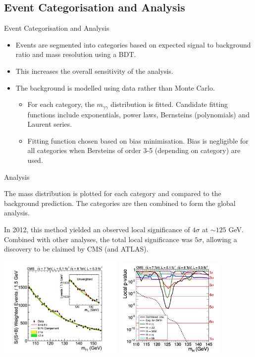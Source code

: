 \documentclass{beamer}
\begin{document}
\subsection{Event Categorisation and Analysis}

\begin{frame}{Event Categorisation and Analysis}
\begin{itemize}
\item Events are segmented into categories based on expected signal to background ratio and mass resolution using a BDT.
\item This increases the overall sensitivity of the analysis.
\item The background is modelled using data rather than Monte Carlo.
\vspace{5px}
\begin{itemize}
\pause \item For each category, the $m_{\gamma\gamma}$ distribution is fitted. Candidate fitting functions include exponentials, power laws, Bernsteins (polynomials) and Laurent series. 
\pause \item Fitting function chosen based on bias minimisation. Bias is negligible for all categories when Bersteins of order 3-5 (depending on category) are used.
\end{itemize}

\end{itemize}
\end{frame}

\begin{frame}{Analysis}
\begin{itemize}{ \footnotesize
\item The mass distribution is plotted for each category and compared to the background prediction. The categories are then combined to form the global analysis.

\item In 2012, this method yielded an observed local significance of $4\sigma$ at $\sim 125$ GeV. Combined with other analyses, the total local significance was $5\sigma$, allowing a discovery to be claimed by CMS (and ATLAS).}
 \includegraphics[width=0.455\textwidth]{"Plot"}
\includegraphics[width=0.4\textwidth]{"PValue"}
\end{itemize}
\end{frame}
\end{document}
